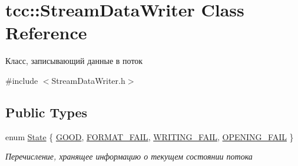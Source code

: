 \hypertarget{classtcc_1_1_stream_data_writer}{}\section{tcc\+:\+:Stream\+Data\+Writer Class Reference}
\label{classtcc_1_1_stream_data_writer}


Класс, записывающий данные в поток  




{\ttfamily \#include $<$Stream\+Data\+Writer.\+h$>$}

\subsection*{Public Types}
\begin{DoxyCompactItemize}
\item 
enum \hyperlink{classtcc_1_1_stream_data_writer_a014e8165660b60c024aee93941f283e1}{State} \{ \hyperlink{classtcc_1_1_stream_data_writer_a014e8165660b60c024aee93941f283e1a9afa26fd0d0b5478c4f9ae14fafd6f91}{G\+O\+OD}, 
\hyperlink{classtcc_1_1_stream_data_writer_a014e8165660b60c024aee93941f283e1ab57cc7a522ed023eb3fdc2ed9c37fc51}{F\+O\+R\+M\+A\+T\+\_\+\+F\+A\+IL}, 
\hyperlink{classtcc_1_1_stream_data_writer_a014e8165660b60c024aee93941f283e1aba75a6bc4011e9f5f35a79397dc25757}{W\+R\+I\+T\+I\+N\+G\+\_\+\+F\+A\+IL}, 
\hyperlink{classtcc_1_1_stream_data_writer_a014e8165660b60c024aee93941f283e1ab93abf8c0674741cc71f768f1433b15c}{O\+P\+E\+N\+I\+N\+G\+\_\+\+F\+A\+IL}
 \}\begin{DoxyCompactList}\small\item\em Перечисление, хранящее информацию о текущем состоянии потока \end{DoxyCompactList}
\end{DoxyCompactItemize}
